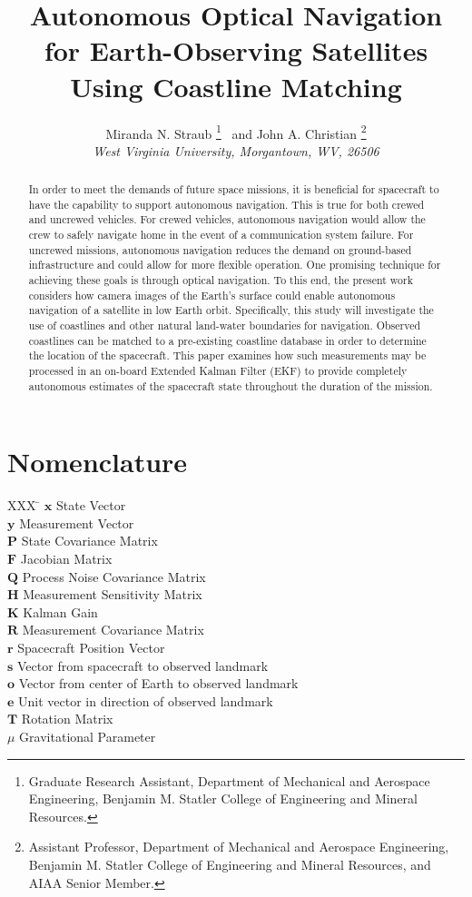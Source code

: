 \documentclass[]{aiaa-tc}%
\title{Autonomous Optical Navigation for Earth-Observing Satellites Using Coastline Matching}
\author{
  Miranda N. Straub%
    \thanks{Graduate Research Assistant, Department of Mechanical and Aerospace Engineering, Benjamin M. Statler College of Engineering and Mineral Resources.}
  \ and John A. Christian%
	\thanks{Assistant Professor, Department of Mechanical and Aerospace Engineering, Benjamin M. Statler College of Engineering and Mineral Resources, and AIAA Senior Member.}\\
  {\normalsize\itshape
  West Virginia University, Morgantown, WV, 26506}
 }
\begin{document}
\maketitle

\begin{abstract}
In order to meet the demands of future space missions, it is beneficial for spacecraft to have the capability to support autonomous navigation. This is true for both crewed and uncrewed vehicles. For crewed vehicles, autonomous navigation would allow the crew to safely navigate home in the event of a communication system failure. For uncrewed missions, autonomous navigation reduces the demand on ground-based infrastructure and could allow for more flexible operation. One promising technique for achieving these goals is through optical navigation. To this end, the present work considers how camera images of the Earth's surface could enable autonomous navigation of a satellite in low Earth orbit. Specifically, this study will investigate the use of coastlines and other natural land-water boundaries for navigation. Observed coastlines can be matched to a pre-existing coastline database in order to determine the location of the spacecraft. This paper examines how such measurements may be processed in an on-board Extended Kalman Filter (EKF) to provide completely autonomous estimates of the spacecraft state throughout the duration of the mission.
\end{abstract}

\section*{Nomenclature}

\begin{tabbing}
  XXX \= \kill%
  $\textbf{x}$ \> State Vector \\
  $\textbf{y}$ \> Measurement Vector \\
  $\textbf{P}$ \> State Covariance Matrix \\
  $\textbf{F}$ \> Jacobian Matrix \\
  $\textbf{Q}$ \> Process Noise Covariance Matrix \\
  $\textbf{H}$ \> Measurement Sensitivity Matrix \\
  $\textbf{K}$ \> Kalman Gain \\
  $\textbf{R}$ \> Measurement Covariance Matrix \\
  $\textbf{r}$ \> Spacecraft Position Vector \\
  $\textbf{s}$ \> Vector from spacecraft to observed landmark \\
  $\textbf{o}$ \> Vector from center of Earth to observed landmark \\
  $\textbf{e}$ \> Unit vector in direction of observed landmark \\
  $\textbf{T}$ \> Rotation Matrix \\
  $\mu$ \> Gravitational Parameter \\ [5pt]
 \end{tabbing}
\end{document}
